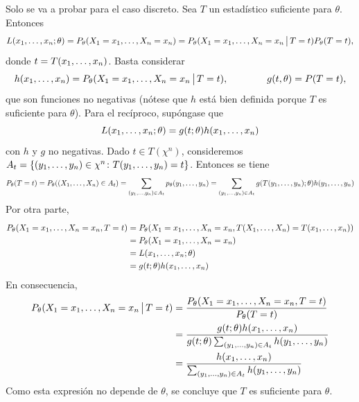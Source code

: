 \documentclass[11pt]{report}
\makeatletter
\renewenvironment{proof}[1][\proofname]{\par
  \pushQED{\qed}%
  \normalfont \topsep\z@skip %
  \trivlist
  \item[\hskip\labelsep
        \itshape
    #1\@addpunct{.}]\ignorespaces
}{%
  \popQED\endtrivlist\@endpefalse
}
\theoremstyle{definition}
\makeatother
\begin{document}
\begin{proof}
Solo se va a probar para el caso discreto. Sea $T$ un estadístico suficiente para $\theta$. Entonces
\[L(x_1,\mathellipsis,x_n;\theta) = P_\theta(X_1=x_1,\mathellipsis,X_n=x_n) =P_\theta(X_1=x_1,\mathellipsis,X_n = x_n \, \big| \, T=t)P_\theta(T=t),\]
donde $t = T(x_1,\mathellipsis,x_n)$. Basta considerar
\[h(x_1,\mathellipsis,x_n) = P_\theta(X_1=x_1,\mathellipsis,X_n = x_n \, \big| \, T=t), \qquad \qquad g(t,\theta) = P(T=t),\]
que son funciones no negativas (nótese que $h$ está bien definida porque $T$ es suficiente para $\theta$). Para el recíproco, supóngase que
\[L(x_1,\mathellipsis,x_n;\theta) = g(t;\theta)h(x_1,\mathellipsis,x_n)\]
con $h$ y $g$ no negativas. Dado $t\in T(\chi^n)$, consideremos $A_t = \left\{(y_1,\mathellipsis,y_n) \in \chi^n \colon T(y_1,\mathellipsis,y_n) = t\right\}$. Entonces se tiene
\[P_\theta(T=t) = P_\theta((X_1,\mathellipsis,X_n) \in A_t) = \sum_{(y_1,\mathellipsis,y_n) \in A_t} p_\theta(y_1,\mathellipsis,y_n) = \sum_{(y_1,\mathellipsis,y_n) \in A_t} g(T(y_1,\mathellipsis,y_n);\theta)h(y_1,\mathellipsis,y_n)\]
Por otra parte,
\[
\begin{aligned}[t]
P_\theta(X_1=x_1,\mathellipsis,X_n=x_n,T=t) &= P_\theta(X_1=x_1,\mathellipsis,X_n=x_n,T(X_1,\mathellipsis,X_n)=T(x_1,\mathellipsis,x_n)) \\
&=P_\theta(X_1=x_1,\mathellipsis,X_n=x_n) \\
&= L(x_1,\mathellipsis,x_n;\theta) \\
&= g(t;\theta)h(x_1,\mathellipsis,x_n)
\end{aligned}
\]
En consecuencia,
\[\begin{aligned}[t]
P_\theta(X_1=x_1,\mathellipsis,X_n=x_n \, \big| \, T = t) &= \frac{P_\theta(X_1=x_1,\mathellipsis,X_n=x_n,T=t)}{P_\theta(T=t)} \\
&= \frac{ g(t;\theta)h(x_1,\mathellipsis,x_n)}{ g(t;\theta)\sum_{(y_1,\mathellipsis,y_n) \in A_t} h(y_1,\mathellipsis,y_n)} \\
&=\frac{h(x_1,\mathellipsis,x_n)}{\sum_{(y_1,\mathellipsis,y_n) \in A_t} h(y_1,\mathellipsis,y_n)}
\end{aligned} \]
Como esta expresión no depende de $\theta$, se concluye que $T$ es suficiente para $\theta$.
\end{proof}
\end{document}
